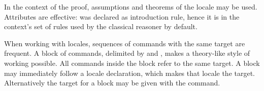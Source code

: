 \begin{isabellebody}
{\isafoldvisible}%
%
\isadelimvisible
%
\endisadelimvisible
%
\begin{isamarkuptext}%
In the context of the proof, assumptions and theorems of the
  locale may be used.  Attributes are effective:  was
  declared as introduction rule, hence it is in the context's set of
  rules used by the classical reasoner by default.%
\end{isamarkuptext}%
\isamarkuptrue%
%
\begin{isamarkuptext}%
When working with locales, sequences of commands with the same
  target are frequent.  A block of commands, delimited by
   and , makes a theory-like style
  of working possible.  All commands inside the block refer to the
  same target.  A block may immediately follow a locale
  declaration, which makes that locale the target.  Alternatively the
  target for a block may be given with the 
  command.


\end{isamarkuptext}
\end{isabellebody}
